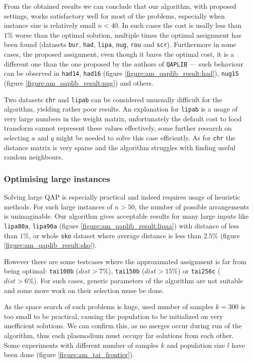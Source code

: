 \documentclass[english,a4paper,twoside]{ppfcmthesis}
\begin{document}
From the obtained results we can conclude that our algorithm, with proposed settings, works satisfactory well for most of the problems, especially when instance size is relatively small $n<40$. In such cases the cost is usally less than $1\%$ worse than the optimal solution, multiple times the optimal assignment has been found (datasets \texttt{bur}, \texttt{had}, \texttt{lipa}, \texttt{nug}, \texttt{rou} and \texttt{scr}). Furthermore in some cases, the proposed assignment, even though it bares the optimal cost, it is a different one than the one proposed by the authors of \texttt{QAPLIB} --- such behaviour can be observed in \texttt{had14}, \texttt{had16} (figure \ref{figure:am_qaplib_result:had}), \texttt{nug15} (figure \ref{figure:am_qaplib_result:nug}) and others.

Two datasets \texttt{chr} and \texttt{lipab} can be considered unusually difficult for the algorithm, yielding rather poor results. An explanation for \texttt{lipab} is a usage of very large numbers in the weight matrix, unfortunately the default cost to food transform cannot represent these values effectively, some further research on selecting $a$ and $q$ might be needed to solve this case efficiently. As for \texttt{chr} the distance matrix is very sparse and the algorithm struggles with finding useful random neighbours.


\subsubsection{Optimising large instances}

Solving large QAP is especially practical and indeed requires usage of heuristic methods. For such large instances of $n>50$, the number of possible arrangements is unimaginable. Our algorithm gives acceptable results for many large inputs like \texttt{lipa80a}, \texttt{lipa90a} (figure \ref{figure:am_qaplib_result:lipaa}) with distance of less than $1\%$, or whole \texttt{sko} dataset where average distance is less than $2.5\%$ (figure \ref{figure:am_qaplib_result:sko}).

However there are some testcases where the approximated assignment is far from being optimal: \texttt{tai100b} ($dist>7\%$), \texttt{tai150b} ($dist>15\%$) or \texttt{tai256c} ($dist>6\%$). For such cases, generic parameters of the algorithm are not suitable and some more work on their selection muse be done.

As the space search of such problems is huge, used number of samples $k=300$ is too small to be practical, causing the population to be initialized on very unefficient solutions. We can confirm this, as no merges occur during run of the algorithm, thus each plasmodium must occupy far solutions from each other. Some experiments with different number of samples $k$ and population size $l$ have been done (figure \ref{figure:am_tai_frontier}).
\end{document}
